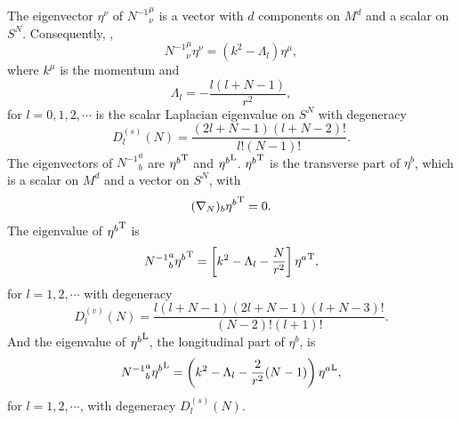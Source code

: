 \documentclass[a4paper,aps,preprint,groupedaddress,showpacs]{revtex4}
\begin{document}
The eigenvector $\eta^{\nu}$ of ${N^{-1}}^{\mu}_{\nu}$ is a 
vector with $d$ components on $M^{d}$ and a scalar on $S^{N}$. 
Consequently, \cite{RO}, 
\begin{equation}
{N^{-1}}^{\mu}_{\nu}\eta^{\nu}=(k^{2}-\Lambda_{l})\eta^{\mu},
\label{N1}
\end{equation}
where $k^{\mu}$ is the momentum and 
\begin{equation}
\Lambda_{l}=-\frac{l(l+N-1)}{r^{2}},
\end{equation}
for $l=0,1,2,\cdots$ is the scalar Laplacian eigenvalue on $S^{N}$
with degeneracy
\begin{equation}
D^{(s)}_{l}(N)=\frac{(2l+N-1)(l+N-2)!}{l!(N-1)!}.
\end{equation}
The eigenvectors of ${N^{-1}}^{a}_{b}$ are ${\eta^{b}}^{\rm T}$ and
${\eta^{b}}^{\rm L}$. ${\eta^{b}}^{\rm T}$ is the transverse part of 
$\eta^{b}$, which is a scalar on $M^{d}$ and a vector on $S^{N}$,
with
\begin{equation}
(\nabla_{N})_{b}{\eta^{b}}^{\rm T}=0.
\end{equation}
The eigenvalue of ${\eta^{b}}^{\rm T}$ is 
\begin{equation}
{N^{-1}}^{a}_{b}{\eta^{b}}^{\rm T}=
\left[k^{2}-\Lambda_{l}-\frac{N}{r^{2}}\right]{\eta^{a}}^{\rm T},
\label{N2}
\end{equation}
for $l=1,2,\cdots$ with degeneracy
\begin{equation}
D^{(v)}_{l}(N)=\frac{l(l+N-1)(2l+N-1)(l+N-3)!}{(N-2)!(l+1)!}.
\end{equation}
And the eigenvalue of ${\eta^{b}}^{\rm L}$, the longitudinal part
of $\eta^{b}$, is
\begin{equation}
{N^{-1}}^{a}_{b}{\eta^{b}}^{\rm L}=
\left(k^{2}-\Lambda_{l}-\frac{2}{r^2}(N-1)\right)
{\eta^{a}}^{\rm L},
\label{N3}
\end{equation}
for $l=1,2,\cdots$, with degeneracy $D^{(s)}_{l}(N)$.
\end{document}
